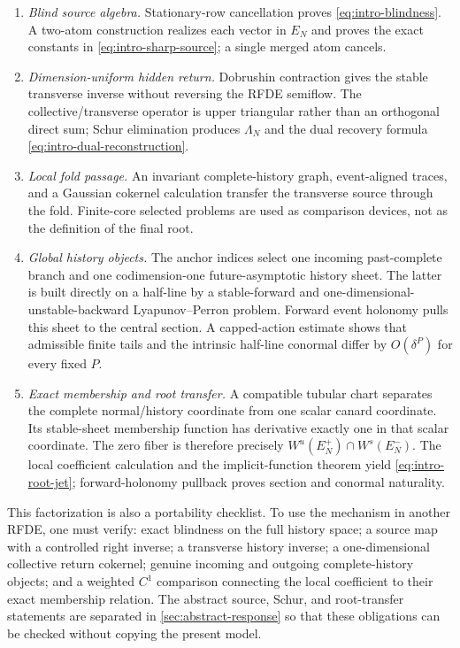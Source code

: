 \begin{enumerate}[label=\textup{P\arabic*.},leftmargin=3.2em]
\item \emph{Blind source algebra.}  Stationary-row cancellation proves
\cref{eq:intro-blindness}.  A two-atom construction realizes each vector in
\(E_N\) and proves the exact constants in
\cref{eq:intro-sharp-source}; a single merged atom cancels.

\item \emph{Dimension-uniform hidden return.}  Dobrushin contraction gives
the stable transverse inverse without reversing the RFDE semiflow.  The
collective/transverse operator is upper triangular rather than an orthogonal
direct sum; Schur elimination produces \(\Lambda_N\) and the dual recovery
formula \cref{eq:intro-dual-reconstruction}.

\item \emph{Local fold passage.}  An invariant complete-history graph,
event-aligned traces, and a Gaussian cokernel calculation transfer the
transverse source through the fold.  Finite-core selected problems are used
as comparison devices, not as the definition of the final root.

\item \emph{Global history objects.}  The anchor indices select one incoming
past-complete branch and one codimension-one future-asymptotic history sheet.
The latter is built directly on a half-line by a stable-forward and
one-dimensional-unstable-backward Lyapunov--Perron problem.  Forward event
holonomy pulls this sheet to the central section.  A capped-action estimate
shows that admissible finite tails and the intrinsic half-line conormal differ
by \(O(\delta^P)\) for every fixed \(P\).

\item \emph{Exact membership and root transfer.}  A compatible tubular chart
separates the complete normal/history coordinate from one scalar canard
coordinate.  Its stable-sheet membership function has derivative exactly one
in that scalar coordinate.  The zero fiber is therefore precisely
\(W^u(E_N^+)\cap W^s(E_N^-)\).  The local coefficient calculation and the
implicit-function theorem yield \cref{eq:intro-root-jet}; forward-holonomy
pullback proves section and conormal naturality.
\end{enumerate}

This factorization is also a portability checklist.  To use the mechanism in
another RFDE, one must verify: exact blindness on the full history space; a
source map with a controlled right inverse; a transverse history inverse; a
one-dimensional collective return cokernel; genuine incoming and outgoing
complete-history objects; and a weighted \(C^1\) comparison connecting the
local coefficient to their exact membership relation.  The abstract source,
Schur, and root-transfer statements are separated in
\cref{sec:abstract-response} so that these obligations can be checked without
copying the present model.

